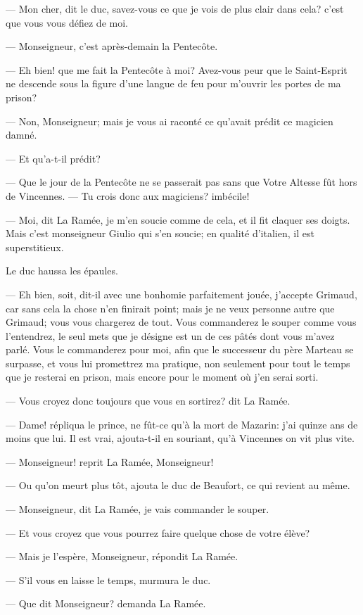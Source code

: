 — Mon cher, dit le duc, savez-vous ce que je vois de plus clair dans cela? c'est que vous vous défiez de moi.

— Monseigneur, c'est après-demain la Pentecôte.

— Eh bien! que me fait la Pentecôte à moi? Avez-vous peur que le Saint-Esprit ne descende sous la figure d'une langue de feu pour m'ouvrir les portes de ma prison?

— Non, Monseigneur; mais je vous ai raconté ce qu'avait prédit ce magicien damné.

— Et qu'a-t-il prédit?

— Que le jour de la Pentecôte ne se passerait pas sans que Votre Altesse fût hors de Vincennes.
— Tu crois donc aux magiciens? imbécile!

— Moi, dit La Ramée, je m'en soucie comme de cela, et il fit claquer ses doigts. Mais c'est monseigneur Giulio qui s'en soucie; en qualité d'italien, il est superstitieux.

Le duc haussa les épaules.

— Eh bien, soit, dit-il avec une bonhomie parfaitement jouée, j'accepte Grimaud, car sans cela la chose n'en finirait point; mais je ne veux personne autre que Grimaud; vous vous chargerez de tout. Vous commanderez le souper comme vous l'entendrez, le seul mets que je désigne est un de ces pâtés dont vous m'avez parlé. Vous le commanderez pour moi, afin que le successeur du père Marteau se surpasse, et vous lui promettrez ma pratique, non seulement pour tout le temps que je resterai en prison, mais encore pour le moment où j'en serai sorti.

— Vous croyez donc toujours que vous en sortirez? dit La Ramée.

— Dame! répliqua le prince, ne fût-ce qu'à la mort de Mazarin: j'ai quinze ans de moins que lui. Il est vrai, ajouta-t-il en souriant, qu'à Vincennes on vit plus vite.

— Monseigneur! reprit La Ramée, Monseigneur!

— Ou qu'on meurt plus tôt, ajouta le duc de Beaufort, ce qui revient au même.

— Monseigneur, dit La Ramée, je vais commander le souper.

— Et vous croyez que vous pourrez faire quelque chose de votre élève?

— Mais je l'espère, Monseigneur, répondit La Ramée.

— S'il vous en laisse le temps, murmura le duc.

— Que dit Monseigneur? demanda La Ramée.


